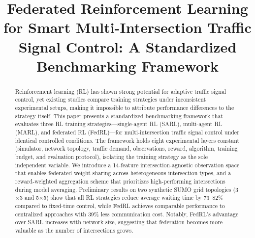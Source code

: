\documentclass[conference]{IEEEtran}
\begin{document}
\title{Federated Reinforcement Learning for Smart Multi-Intersection Traffic Signal Control: A Standardized Benchmarking Framework}

\author{
\and
{}
\and
{}
\and
{}
\and
{}
}

\maketitle

\begin{abstract}
Reinforcement learning (RL) has shown strong potential for adaptive traffic signal control, yet existing studies compare training strategies under inconsistent experimental setups, making it impossible to attribute performance differences to the strategy itself. This paper presents a standardized benchmarking framework that evaluates three RL training strategies---single-agent RL (SARL), multi-agent RL (MARL), and federated RL (FedRL)---for multi-intersection traffic signal control under identical controlled conditions. The framework holds eight experimental layers constant (simulator, network topology, traffic demand, observations, reward, algorithm, training budget, and evaluation protocol), isolating the training strategy as the sole independent variable. We introduce a 14-feature intersection-agnostic observation space that enables federated weight sharing across heterogeneous intersection types, and a reward-weighted aggregation scheme that prioritizes high-performing intersections during model averaging. Preliminary results on two synthetic SUMO grid topologies (3$\times$3 and 5$\times$5) show that all RL strategies reduce average waiting time by 73--82\% compared to fixed-time control, while FedRL achieves comparable performance to centralized approaches with 39\% less communication cost. Notably, FedRL's advantage over SARL increases with network size, suggesting that federation becomes more valuable as the number of intersections grows.
\end{abstract}
\end{document}

